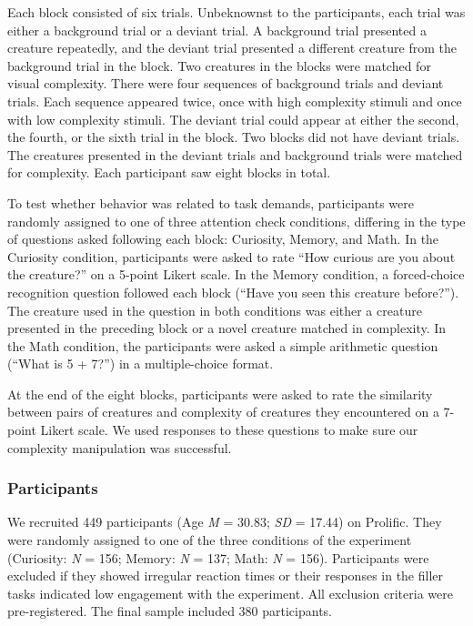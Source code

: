 \documentclass[10pt, letterpaper]{article}
\begin{document}
Each block consisted of six trials. Unbeknownst to the participants,
each trial was either a background trial or a deviant trial. A
background trial presented a creature repeatedly, and the deviant trial
presented a different creature from the background trial in the block.
Two creatures in the blocks were matched for visual complexity. There
were four sequences of background trials and deviant trials. Each
sequence appeared twice, once with high complexity stimuli and once with
low complexity stimuli. The deviant trial could appear at either the
second, the fourth, or the sixth trial in the block. Two blocks did not
have deviant trials. The creatures presented in the deviant trials and
background trials were matched for complexity. Each participant saw
eight blocks in total.

To test whether behavior was related to task demands, participants were
randomly assigned to one of three attention check conditions, differing
in the type of questions asked following each block: Curiosity, Memory,
and Math. In the Curiosity condition, participants were asked to rate
``How curious are you about the creature?'' on a 5-point Likert scale.
In the Memory condition, a forced-choice recognition question followed
each block (``Have you seen this creature before?''). The creature used
in the question in both conditions was either a creature presented in
the preceding block or a novel creature matched in complexity. In the
Math condition, the participants were asked a simple arithmetic question
(``What is 5 + 7?'') in a multiple-choice format.

At the end of the eight blocks, participants were asked to rate the
similarity between pairs of creatures and complexity of creatures they
encountered on a 7-point Likert scale. We used responses to these
questions to make sure our complexity manipulation was successful.

\hypertarget{participants}{%
\subsubsection{Participants}\label{participants}}

We recruited 449 participants (Age \emph{M} = 30.83; \emph{SD} = 17.44)
on Prolific. They were randomly assigned to one of the three conditions
of the experiment (Curiosity: \emph{N} = 156; Memory: \emph{N} = 137;
Math: \emph{N} = 156). Participants were excluded if they showed
irregular reaction times or their responses in the filler tasks
indicated low engagement with the experiment. All exclusion criteria
were pre-registered. The final sample included 380 participants.
\end{document}
